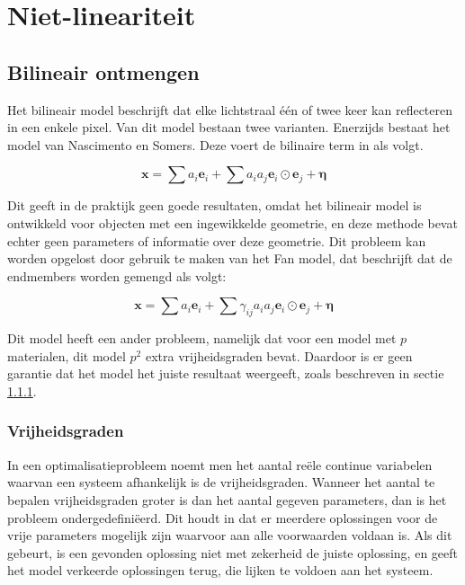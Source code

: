 \documentclass[12pt]{report}
\begin{document}
\chapter{Niet-lineariteit\cite{mlinmix}}


\section{Bilineair ontmengen}

Het bilineair model beschrijft dat elke lichtstraal \'e\'en of twee keer kan reflecteren in een enkele pixel. Van dit model bestaan twee varianten. Enerzijds bestaat het model van Nascimento en Somers\cite{mlinmix}. Deze voert de bilinaire term in als volgt.

\begin{equation}
\bm{x} = \sum a_i \bm{e}_i + \sum a_i a_j \bm{e}_i \odot \bm{e}_j + \bm{\eta}
\end{equation}

Dit geeft in de praktijk geen goede resultaten, omdat het bilineair model is ontwikkeld voor objecten met een ingewikkelde geometrie, en deze methode bevat echter geen parameters of informatie over deze geometrie. Dit probleem kan worden opgelost door gebruik te maken van het Fan model\cite{mlinmix}, dat beschrijft dat de endmembers worden gemengd als volgt:

\begin{equation}
\bm{x} = \sum a_i \bm{e}_i + \sum \gamma_{ij} a_i a_j \bm{e}_i \odot \bm{e}_j + \bm{\eta}
\end{equation}

Dit model heeft een ander probleem, namelijk dat voor een model met $p$ materialen, dit model $p^2$ extra vrijheidsgraden bevat. Daardoor is er geen garantie dat het model het juiste resultaat weergeeft, zoals beschreven in sectie \ref{sec:vrij}. 



\subsection{Vrijheidsgraden} \label{sec:vrij}

In een optimalisatieprobleem noemt men het aantal re\"ele continue variabelen waarvan een systeem afhankelijk is de vrijheidsgraden. Wanneer het aantal te bepalen vrijheidsgraden groter is dan het aantal gegeven parameters, dan is het probleem ondergedefini\"eerd. Dit houdt in dat er meerdere  oplossingen voor de vrije parameters mogelijk zijn waarvoor aan alle voorwaarden voldaan is. Als dit gebeurt, is een gevonden oplossing niet met zekerheid de juiste oplossing, en geeft het model verkeerde oplossingen terug, die lijken te voldoen aan het systeem.
\end{document}
